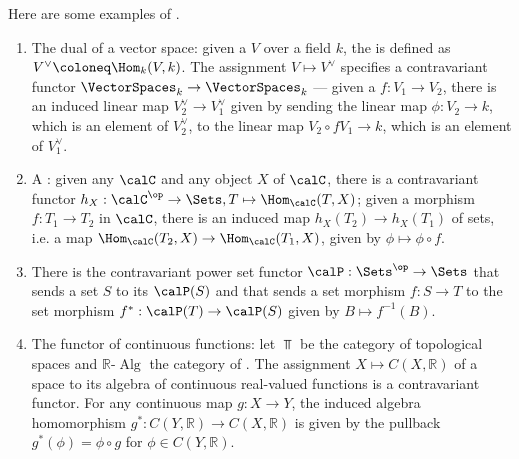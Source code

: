 

\begin{example} \label{example:examples_of_contravariant_functors}
    Here are some examples of .
    \begin{enumerate}
        \item The dual of a vector space: given a  $V$ over a field $k$, the  is defined as $V^\vee \coloneq \Hom_k(V, k)$. The assignment $V \mapsto V^\vee$ specifies a contravariant functor $\VectorSpaces_k \to \VectorSpaces_k$ --- given a  $f:V_1 \to V_2$, there is an induced linear map $V_2^\vee \to V_1^\vee$ given by sending the linear map $\phi: V_2 \to k$, which is an element of $V_2^\vee$, to the linear map $V_2 \circ f V_1 \to k$, which is an element of $V_1^\vee$. 


        \item A : given any  $\calC$ and any object $X$ of $\calC$, there is a contravariant functor $h_X: \calC^{\op} \to \Sets, T \mapsto \Hom_{\calC}(T,X)$; given a morphism $f:T_1 \to T_2$ in $\calC$, there is an induced map $h_X(T_2) \to h_X(T_1)$ of sets, i.e. a map $\Hom_\calC(T_2, X) \to \Hom_\calC(T_1, X)$, given by $\phi \mapsto \phi \circ f$.

        \item There is the contravariant power set functor $\calP: \Sets^{\op} \to \Sets$ that sends a set $S$ to its  $\calP(S)$ and that sends a set morphism $f: S \to T$ to the set morphism $f^*: \calP(T) \to \calP(S)$ given by $B \mapsto f^{-1}(B)$. 
        

        \item The functor of continuous functions: let $\Top$ be the category of topological spaces and $\mathbb{R}\text{-}\operatorname{Alg}$ the category of . The assignment $X \mapsto C(X, \mathbb{R})$ of a space to its algebra of continuous real-valued functions is a contravariant functor. For any continuous map $g: X \to Y$, the induced algebra homomorphism $g^*: C(Y, \mathbb{R}) \to C(X, \mathbb{R})$ is given by the pullback $g^*(\phi) = \phi \circ g$ for $\phi \in C(Y, \mathbb{R})$.


    \end{enumerate}
\end{example}
